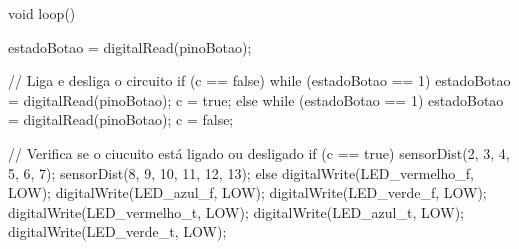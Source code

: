 void loop() {
  estadoBotao = digitalRead(pinoBotao);

  // Liga e desliga o circuito
  if (c == false) {
    while (estadoBotao == 1) {
      estadoBotao = digitalRead(pinoBotao);
      c = true;
    }
  } else {
    while (estadoBotao == 1) {
      estadoBotao = digitalRead(pinoBotao);
      c = false;
    }
  }

  // Verifica se o ciucuito está ligado ou desligado
  if (c == true) {
    sensorDist(2, 3, 4, 5, 6, 7);
    sensorDist(8, 9, 10, 11, 12, 13);
  } else {
    digitalWrite(LED_vermelho_f, LOW);
    digitalWrite(LED_azul_f, LOW);
    digitalWrite(LED_verde_f, LOW);
    digitalWrite(LED_vermelho_t, LOW);
    digitalWrite(LED_azul_t, LOW);
    digitalWrite(LED_verde_t, LOW);
  }
}